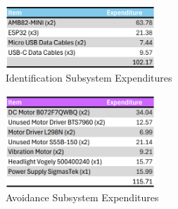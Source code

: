 \begin{figure}[H]
	\centering
	\includegraphics[width=0.5\textwidth]{./Images/identify-bom.png}
	\caption{\label{fig:identify-bom}Identification Subsystem Expenditures}
\end{figure}

\begin{figure}[H]
	\centering
	\includegraphics[width=0.5\textwidth]{./Images/avoid-bom.png}
	\caption{\label{fig:avoid-bom}Avoidance Subsystem Expenditures}
\end{figure}